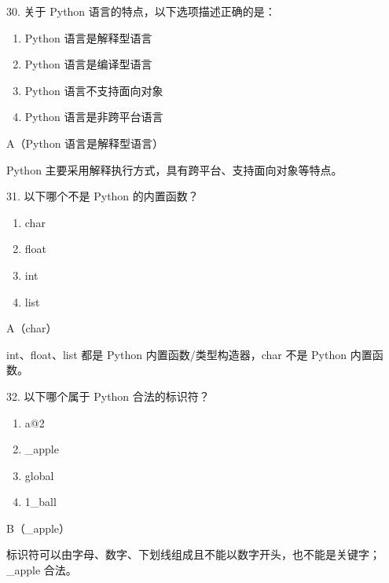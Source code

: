 \begin{question}{30. 关于 Python 语言的特点，以下选项描述正确的是：}
\begin{enumerate}[label=\Alph*., leftmargin=2.4em, itemsep=0.2em]
\item Python 语言是解释型语言
\item Python 语言是编译型语言
\item Python 语言不支持面向对象
\item Python 语言是非跨平台语言
\end{enumerate}
\end{question}
\begin{answer}
A（Python 语言是解释型语言）
\end{answer}
\begin{explanation}
Python 主要采用解释执行方式，具有跨平台、支持面向对象等特点。
\end{explanation}

\begin{question}{31. 以下哪个不是 Python 的内置函数？}
\begin{enumerate}[label=\Alph*., leftmargin=2.4em, itemsep=0.2em]
\item char
\item float
\item int
\item list
\end{enumerate}
\end{question}
\begin{answer}
A（char）
\end{answer}
\begin{explanation}
int、float、list 都是 Python 内置函数/类型构造器，char 不是 Python 内置函数。
\end{explanation}

\begin{question}{32. 以下哪个属于 Python 合法的标识符？}
\begin{enumerate}[label=\Alph*., leftmargin=2.4em, itemsep=0.2em]
\item a@2
\item \_apple
\item global
\item 1\_ball
\end{enumerate}
\end{question}
\begin{answer}
B（\_apple）
\end{answer}
\begin{explanation}
标识符可以由字母、数字、下划线组成且不能以数字开头，也不能是关键字；_apple 合法。
\end{explanation}

